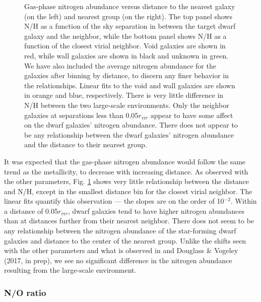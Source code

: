 \begin{figure}
    \caption[N/H versus distance to nearest neighbor and group]{Gas-phase 
    nitrogen abundance versus distance to the nearest galaxy (on the left) and 
    nearest group (on the right).  The top panel shows N/H as a function of the 
    sky separation in \hMpc between the target dwarf galaxy and the neighbor, 
    while the bottom panel shows N/H as a function of the closest virial 
    neighbor.  Void galaxies are shown in red, while wall galaxies are shown in 
    black and unknown in green.  We have also included the average nitrogen 
    abundance for the galaxies after binning by distance, to discern any finer 
    behavior in the relationships.  Linear fits to the void and wall galaxies 
    are shown in orange and blue, respectively.  There is very little difference 
    in N/H between the two large-scale environments.  Only the neighbor galaxies 
    at separations less than 0.05$r_{vir}$ appear to have some affect on the 
    dwarf galaxies' nitrogen abundance.  There does not appear to be any 
    relationship between the dwarf galaxies' nitrogen abundance and the distance 
    to their nearest group.}
    \label{fig:NH}
\end{figure}

It was expected that the gas-phase nitrogen abundance would follow the same 
trend as the metallicity, to decrease with increasing distance.  As observed 
with the other parameters, Fig. \ref{fig:NH} shows very little relationship 
between the distance and N/H, except in the smallest distance bin for the 
closest virial neighbor.  The linear fits quantify this observation --- the 
slopes are on the order of 10$^{-2}$.  Within a distance of 0.05$r_{vir}$, dwarf 
galaxies tend to have higher nitrogen abundances than at distances further from 
their nearest neighbor.  There does not seem to be any relationship between the 
nitrogen abundance of the star-forming dwarf galaxies and distance to the center 
of the nearest group.  Unlike the shifts seen with the other parameters and what 
is observed in \cite{Douglass17b} and Douglass \& Vogeley (2017, in prep), we 
see no significant difference in the nitrogen abundance resulting from the 
large-scale environment.


\subsubsection{N/O ratio}

